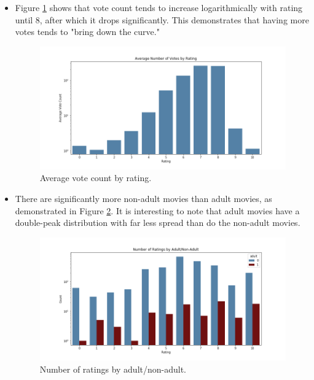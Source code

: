 \documentclass[12pt, oneside]{article}   	%
\begin{document}
\begin{itemize}

\item Figure \ref{fig:vote_count_by_rating} shows that vote count tends to increase logarithmically with rating until 8, after which it drops significantly. This demonstrates that having more votes tends to "bring down the curve."

\begin{figure}%
\includegraphics[width=\textwidth]{vote_count_by_rating}
\caption{\label{fig:vote_count_by_rating}Average vote count by rating.}
\end{figure}

\item There are significantly more non-adult movies than adult movies, as demonstrated in Figure \ref{fig:ratings_by_adult}. It is interesting to note that adult movies have a double-peak distribution with far less spread than do the non-adult movies.

\begin{figure}%
\includegraphics[width=\textwidth]{ratings_by_adult}
\caption{\label{fig:ratings_by_adult}Number of ratings by adult/non-adult.}
\end{figure}


\end{itemize}
\end{document}
